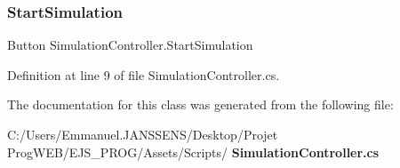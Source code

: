 \subsubsection{Start\+Simulation}
{\footnotesize\ttfamily Button Simulation\+Controller.\+Start\+Simulation}



Definition at line 9 of file Simulation\+Controller.\+cs.



The documentation for this class was generated from the following file\+:\begin{DoxyCompactItemize}
\item 
C\+:/\+Users/\+Emmanuel.\+J\+A\+N\+S\+S\+E\+N\+S/\+Desktop/\+Projet Prog\+W\+E\+B/\+E\+J\+S\+\_\+\+P\+R\+O\+G/\+Assets/\+Scripts/\textbf{ Simulation\+Controller.\+cs}\end{DoxyCompactItemize}
